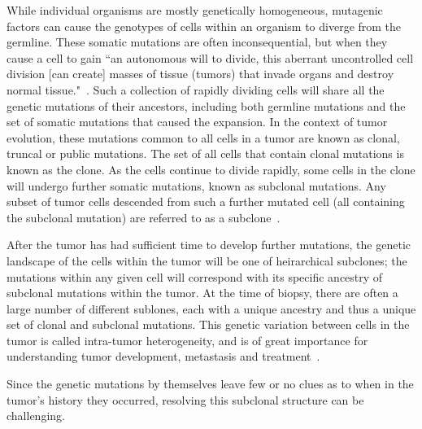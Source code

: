 \documentclass[../../main.tex]{subfiles}
\begin{document}
While individual organisms are mostly genetically homogeneous, mutagenic factors can cause the genotypes of cells within an organism to diverge from the germline.
These somatic mutations are often inconsequential, but when they cause a cell to gain ``an autonomous will to divide, this aberrant uncontrolled cell division [can create] masses of tissue (tumors) that invade organs and destroy normal tissue."~\cite{EmperorMaladies}. 
Such a collection of rapidly dividing cells will share all the genetic mutations of their ancestors, including both germline mutations and the set of somatic mutations that caused the expansion.
In the context of tumor evolution, these mutations common to all cells in a tumor are known as clonal, truncal or public mutations.
The set of all cells that contain clonal mutations is known as the clone.
As the cells continue to divide rapidly, some cells in the clone will undergo further somatic mutations, known as subclonal mutations.
Any subset of tumor cells descended from such a further mutated cell (all containing the subclonal mutation) are referred to as a subclone~\cite{bigbang, 21breasts, metastatic}.

After the tumor has had sufficient time to develop further mutations, the genetic landscape of the cells within the tumor will be one of heirarchical subclones; the mutations within any given cell will correspond with its specific ancestry of subclonal mutations within the tumor.
At the time of biopsy, there are often a large number of different sublones, each with a unique ancestry and thus a unique set of clonal and subclonal mutations.
This genetic variation between cells in the tumor is called intra-tumor heterogeneity, and is of great importance for understanding tumor development, metastasis and treatment~\cite{metastatic, 21breasts, greaves2012clonal, merlo2006cancer}.

Since the genetic mutations by themselves leave few or no clues as to when in the tumor's history they occurred, resolving this subclonal structure can be challenging.

\end{document}
